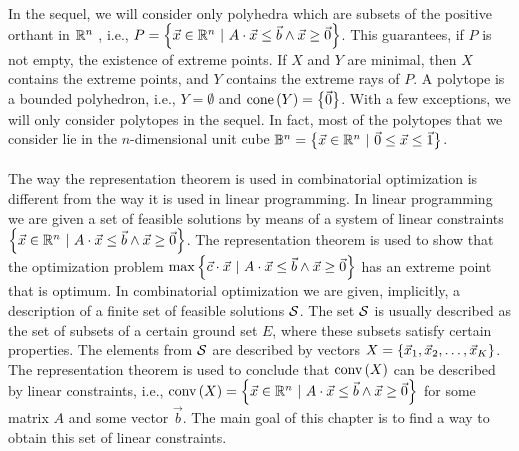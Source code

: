 \documentclass[titlepage]{book}
\theoremstyle{plain}
\theoremstyle{definition}
\theoremstyle{remark}
\begin{document}
\paragraph{}
In the sequel, we will consider only polyhedra which are subsets of the positive orthant in $\mathbb{R}^n$ , i.e., $P=\left\{ \vec{x}\in\mathbb{R}^n\ |\ A\cdot\vec{x}\leq\vec{b}\wedge\vec{x}\geq\vec{0} \right\}$. This guarantees, if $P$ is not empty, the existence of extreme points. If $X$ and $Y$ are minimal, then $X$ contains the extreme points, and $Y$ contains the extreme rays of $P$. A polytope is a bounded polyhedron, i.e., $Y=\emptyset$ and $\mbox{cone}\left( Y \right)=\left\{ \vec{0} \right\}$. With a few exceptions, we will only consider polytopes in the sequel. In fact, most of the polytopes that we consider lie in the $n$-dimensional unit cube $\mathbb{B}^n=\left\{ \vec{x}\in\mathbb{R}^n\ |\ \vec{0}\leq\vec{x}\leq\vec{1} \right\}$.

\paragraph{}
The way the representation theorem is used in combinatorial optimization is different from the way it is used in linear programming. In linear programming we are given a set of feasible solutions by means of a system of linear constraints $\left\{ \vec{x}\in\mathbb{R}^n\ |\ A\cdot\vec{x}\leq\vec{b}\wedge\vec{x}\geq\vec{0} \right\}$. The representation theorem is used to show that the optimization problem $\max\left\{ \vec{c}\cdot\vec{x}\ |\ A\cdot\vec{x}\leq\vec{b}\wedge\vec{x}\geq\vec{0} \right\}$ has an extreme point that is optimum. In combinatorial optimization we are given, implicitly, a description of a finite set of feasible solutions $\mathcal{S}$. The set $\mathcal{S}$ is usually described as the set of subsets of a certain ground set $E$, where these subsets satisfy certain properties. The elements from $\mathcal{S}$ are described by vectors $X=\left\{ \vec{x}_1,\vec{x}_2,\ldots,\vec{x}_K \right\}$. The representation theorem is used to conclude that $\mbox{conv}\left( X \right)$ can be described by linear constraints, i.e., $\mbox{conv}\left( X \right)=\left\{ \vec{x}\in\mathbb{R}^n\ |\ A\cdot\vec{x}\leq\vec{b}\wedge\vec{x}\geq\vec{0} \right\}$ for some matrix $A$ and some vector $\vec{b}$. The main goal of this chapter is to find a way to obtain this set of linear constraints.
\end{document}
